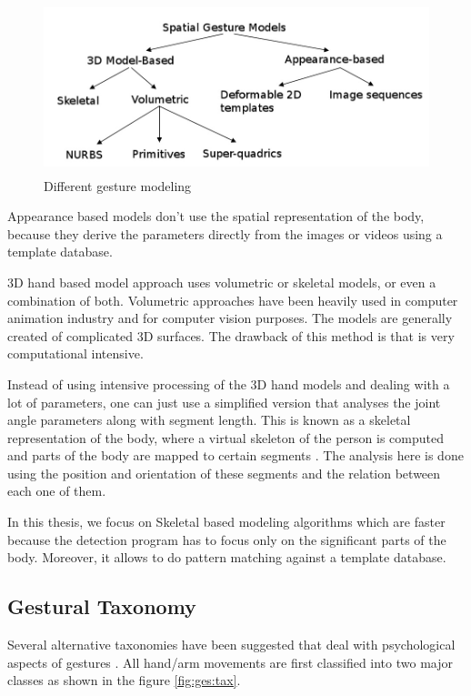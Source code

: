 \begin{figure}
	[h] \centering 
	\includegraphics[height=5cm]{figures/ges-model.png} 
	\caption{Different gesture modeling} 
	\label{fig:ges:model} 
\end{figure}

Appearance based models don't use the spatial representation of the body, because they derive the parameters directly from the images or videos using a template database. 

3D hand based model approach uses volumetric or skeletal models, or even a combination of  both. Volumetric approaches have been heavily used in computer animation industry and for computer vision purposes. The models are generally created of complicated 3D surfaces. The drawback of this method is that is very computational intensive. 

Instead of using intensive processing of the 3D hand models and dealing with a lot of parameters, one can just use a simplified version that analyses the joint angle parameters along with segment length. This is known as a skeletal representation of the body, where a virtual skeleton of the person is computed and parts of the body are mapped to certain segments \cite{4}. The analysis here is done using the position and orientation of these segments and the relation between each one of them.

In this thesis, we focus on Skeletal based modeling algorithms which are faster because the detection program has to focus only on the significant parts of the body. Moreover, it allows to do pattern matching against a template database. 

\subsection{Gestural Taxonomy }
Several alternative taxonomies have been suggested that deal with psychological aspects of gestures \cite{3}. All hand/arm movements are first classified into two major classes as shown in the figure \ref{fig:ges:tax}.

